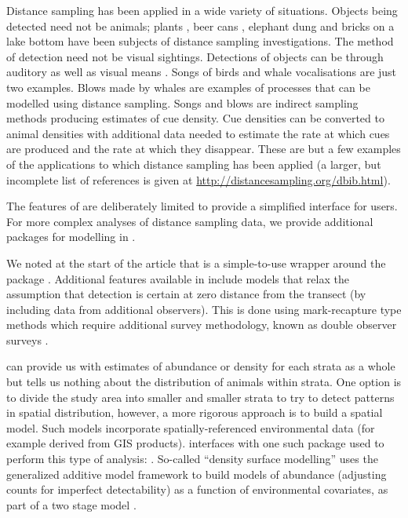 \documentclass[article,shortnames]{jss}
\begin{document}
Distance sampling has been applied in a wide variety of situations.
Objects being detected need not be animals; plants
\citep{Buckland:2007kl}, beer cans \citep{Otto:1990gs}, elephant dung
\citep{NchPlu01} and bricks on a lake bottom \citep{Ber90} have been
subjects of distance sampling investigations. The method of detection
need not be visual sightings. Detections of objects can be through
auditory as well as visual means \citep{Marques2013b}. Songs of birds
\citep{Buckland2006} and whale vocalisations \citep{BorSub1} are just
two examples. Blows made by whales are examples of processes that can be
modelled using distance sampling. Songs and blows are indirect sampling
methods producing estimates of cue density. Cue densities can be
converted to animal densities with additional data needed to estimate
the rate at which cues are produced and the rate at which they
disappear. These are but a few examples of the applications to which
distance sampling has been applied (a larger, but incomplete list of
references is given at \url{http://distancesampling.org/dbib.html}).

The features of  are deliberately limited to provide a
simplified interface for users. For more complex analyses of distance
sampling data, we provide additional packages for modelling in
.

We noted at the start of the article that  is a
simple-to-use wrapper around the package . Additional features
available in  include models that relax the assumption that
detection is certain at zero distance from the transect (by including
data from additional observers). This is done using mark-recapture type
methods which require additional survey methodology, known as double
observer surveys \citep[see][ for an introduction]{Burt:2014gu}.

 can provide us with estimates of abundance or density for
each strata as a whole but tells us nothing about the distribution of
animals within strata. One option is to divide the study area into
smaller and smaller strata to try to detect patterns in spatial
distribution, however, a more rigorous approach is to build a spatial
model. Such models incorporate spatially-referenced environmental data
(for example derived from GIS products).  interfaces with
one such package used to perform this type of analysis: 
\citep{dsm-pkg}. So-called ``density surface modelling'' uses the
generalized additive model framework \citep[e.g.][]{Wood:2006vg} to
build models of abundance (adjusting counts for imperfect detectability)
as a function of environmental covariates, as part of a two stage model
\citep{Hedley:2004et, Miller:2013fq}.
\end{document}
